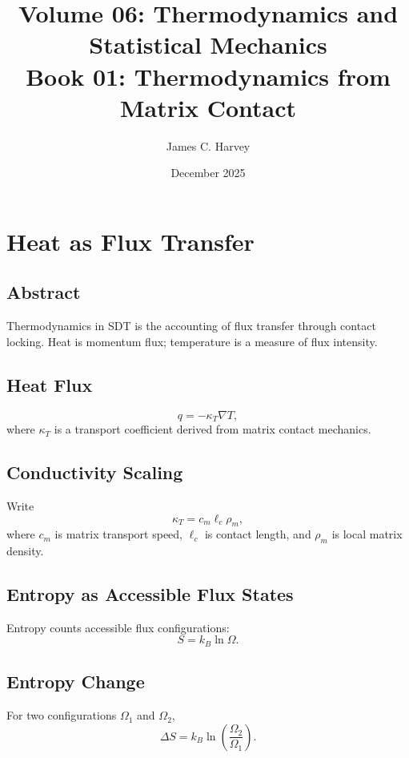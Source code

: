 \documentclass[12pt]{book}
\title{Volume 06: Thermodynamics and Statistical Mechanics \\ Book 01: Thermodynamics from Matrix Contact}
\author{James C. Harvey}
\date{December 2025}
\begin{document}
\maketitle
\tableofcontents

\chapter{Heat as Flux Transfer}

\section*{Abstract}
Thermodynamics in SDT is the accounting of flux transfer through contact locking. Heat is momentum flux;
temperature is a measure of flux intensity.

\section{Heat Flux}
\begin{equation}
q = -\kappa_T \nabla T,
\end{equation}
where $\kappa_T$ is a transport coefficient derived from matrix contact mechanics.

\section{Conductivity Scaling}
Write
\begin{equation}
\kappa_T = c_m \ell_c \rho_m,
\end{equation}
where $c_m$ is matrix transport speed, $\ell_c$ is contact length, and $\rho_m$ is local matrix density.

\section{Entropy as Accessible Flux States}
Entropy counts accessible flux configurations:
\begin{equation}
S = k_B \ln \Omega.
\end{equation}

\section{Entropy Change}
For two configurations $\Omega_1$ and $\Omega_2$,
\begin{equation}
\Delta S = k_B \ln\left(\frac{\Omega_2}{\Omega_1}\right).
\end{equation}
\end{document}
